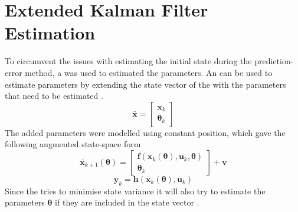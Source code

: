 \section{Extended Kalman Filter Estimation}\label{sec:KalmanEstimation} 
To circumvent the issues with estimating the initial state during the prediction-error method, a \abbrEKF was used to estimated the parameters. An \abbrEKF can  be used to estimate parameters by extending the state vector of the \abbrEKF with the parameters that need to be estimated \citep{Roger}.  
\begin{equation}
\bar{\boldsymbol{x}} = \begin{bmatrix}
\boldsymbol{x}_k\\
\boldsymbol{\theta}_k
\end{bmatrix}
\end{equation}
The added parameters were modelled using constant position, which gave the following augmented state-space form 
\begin{equation}
\bar{\boldsymbol{x}}_{k+1}(\boldsymbol{\theta}) =\begin{bmatrix}
\boldsymbol{f}(\boldsymbol{x}_k(\boldsymbol{\theta}),\boldsymbol{u}_k,\boldsymbol{\theta})\\
\boldsymbol{\theta}_k
\end{bmatrix} 
+\boldsymbol{v}
\end{equation}
\begin{equation}
\boldsymbol{y}_k=\boldsymbol{h}(\bar{\boldsymbol{x}}_k(\boldsymbol{\theta}),\boldsymbol{u}_k)
\end{equation}
Since the \abbrEKF tries to minimise state variance it will also try to estimate the parameters $\boldsymbol{\theta}$ if they are included in the state vector \citep{Roger}.


